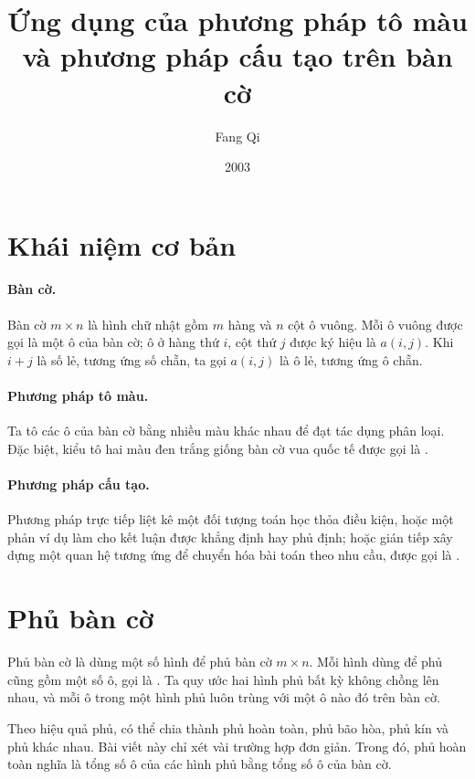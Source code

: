 \documentclass[11pt]{article}
\title{Ứng dụng của phương pháp tô màu và phương pháp cấu tạo trên bàn cờ}
\author{Fang Qi}
\date{2003}
\begin{document}
\maketitle


\section{Khái niệm cơ bản}

\paragraph{Bàn cờ.}
Bàn cờ \(m\times n\) là hình chữ nhật gồm \(m\) hàng và \(n\) cột ô vuông.
Mỗi ô vuông được gọi là một ô của bàn cờ; ô ở hàng thứ \(i\), cột thứ \(j\)
được ký hiệu là \(a(i,j)\). Khi \(i+j\) là số lẻ, tương ứng số chẵn, ta gọi
\(a(i,j)\) là ô lẻ, tương ứng ô chẵn.

\paragraph{Phương pháp tô màu.}
Ta tô các ô của bàn cờ bằng nhiều màu khác nhau để đạt tác dụng phân loại.
Đặc biệt, kiểu tô hai màu đen trắng giống bàn cờ vua quốc tế được gọi là
.

\paragraph{Phương pháp cấu tạo.}
Phương pháp trực tiếp liệt kê một đối tượng toán học thỏa điều kiện, hoặc một
phản ví dụ làm cho kết luận được khẳng định hay phủ định; hoặc gián tiếp xây
dựng một quan hệ tương ứng để chuyển hóa bài toán theo nhu cầu, được gọi là
.

\section{Phủ bàn cờ}

Phủ bàn cờ là dùng một số hình để phủ bàn cờ \(m\times n\). Mỗi hình dùng để
phủ cũng gồm một số ô, gọi là . Ta quy ước hai hình phủ bất kỳ
không chồng lên nhau, và mỗi ô trong một hình phủ luôn trùng với một ô nào đó
trên bàn cờ.

Theo hiệu quả phủ, có thể chia thành phủ hoàn toàn, phủ bão hòa, phủ kín và
phủ khác nhau. Bài viết này chỉ xét vài trường hợp đơn giản. Trong đó, phủ
hoàn toàn nghĩa là tổng số ô của các hình phủ bằng tổng số ô của bàn cờ.
\end{document}
